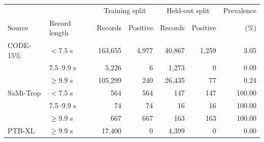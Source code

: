 \begin{tabular}{l l r r r r r}
\hline
 & & \multicolumn{2}{c}{Training split} & \multicolumn{2}{c}{Held-out split} & Prevalence \\
Source & Record length & Records & Positive & Records & Positive & (\%) \\
\hline
CODE-15\% & $<7.5$ s & 163,655 & 4,977 & 40,867 & 1,259 & 3.05 \\
 & 7.5--9.9 s & 5,226 & 6 & 1,273 & 0 & 0.09 \\
 & $\geq 9.9$ s & 105,299 & 240 & 26,435 & 77 & 0.24 \\
\hline
SaMi-Trop & $<7.5$ s & 564 & 564 & 147 & 147 & 100.00 \\
 & 7.5--9.9 s & 74 & 74 & 16 & 16 & 100.00 \\
 & $\geq 9.9$ s & 667 & 667 & 163 & 163 & 100.00 \\
\hline
PTB-XL & $\geq 9.9$ s & 17,400 & 0 & 4,399 & 0 & 0.00 \\
\hline
\end{tabular}
